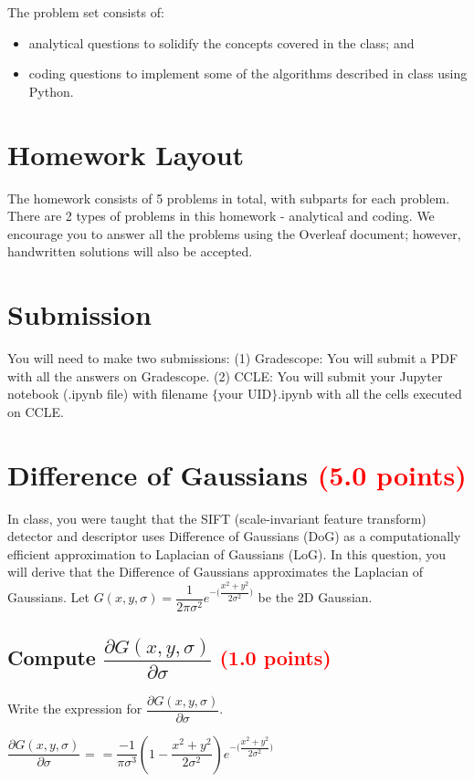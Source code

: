 \documentclass[answers]{exam}
\newcommand{\mypoints}[1]{\textcolor{red}{(#1 points)}}
\begin{document}
The problem set consists of: 
\begin{itemize}
    \item analytical questions to solidify the concepts covered in the class; and
    \item coding questions to implement some of the algorithms described in class using Python.
\end{itemize}

\section*{Homework Layout}
The homework consists of 5 problems in total, with subparts for each problem. There are 2 types of problems in this homework - analytical and coding. We encourage you to answer all the problems using the Overleaf document; however, handwritten solutions will also be accepted.

\section*{Submission}

You will need to make two submissions: (1) Gradescope: You will submit a PDF with all the answers on Gradescope. (2) CCLE: You will submit your Jupyter notebook (.ipynb file) with filename $\{$your UID$\}$.ipynb with all the cells executed on CCLE. 


\newpage
\section{Difference of Gaussians \mypoints{5.0}}
In class, you were taught that the SIFT (scale-invariant feature transform) detector and descriptor uses Difference of Gaussians (DoG) as a computationally efficient approximation to Laplacian of Gaussians (LoG). In this question, you will derive that the Difference of Gaussians approximates the Laplacian of Gaussians. Let $G(x,y, \sigma) = \dfrac{1}{2\pi \sigma^2} e^{-\big(\dfrac{x^2+y^2}{2\sigma^2}\big)}$ be the 2D Gaussian.

\subsection{Compute $\dfrac{\partial G(x,y,\sigma)}{\partial \sigma}$ \mypoints{1.0}}
Write the expression for $\dfrac{\partial G(x,y,\sigma)}{\partial \sigma}$.
 
\begin{solution}
$\dfrac{\partial G(x,y,\sigma)}{\partial \sigma}$ = $= \dfrac{-1}{\pi \sigma^3}(1- \dfrac{x^2 + y^2}{2\sigma^2})e^{-\big(\dfrac{x^2+y^2}{2\sigma^2}\big)}$
\end{solution}
\end{document}
